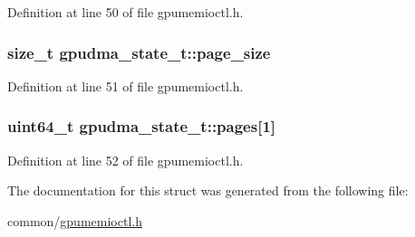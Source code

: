 Definition at line 50 of file gpumemioctl.h.\hypertarget{structgpudma__state__t_a9c5a9f537eb39d78e3505ca858a14aaf}{
\subsubsection[{page\_\-size}]{\setlength{\rightskip}{0pt plus 5cm}size\_\-t {\bf gpudma\_\-state\_\-t::page\_\-size}}}
\label{structgpudma__state__t_a9c5a9f537eb39d78e3505ca858a14aaf}


Definition at line 51 of file gpumemioctl.h.\hypertarget{structgpudma__state__t_a7d45e0f5c232b286ca20c0a5f3e0d032}{
\subsubsection[{pages}]{\setlength{\rightskip}{0pt plus 5cm}uint64\_\-t {\bf gpudma\_\-state\_\-t::pages}\mbox{[}1\mbox{]}}}
\label{structgpudma__state__t_a7d45e0f5c232b286ca20c0a5f3e0d032}


Definition at line 52 of file gpumemioctl.h.

The documentation for this struct was generated from the following file:\begin{DoxyCompactItemize}
\item 
common/\hyperlink{gpumemioctl_8h}{gpumemioctl.h}\end{DoxyCompactItemize}
